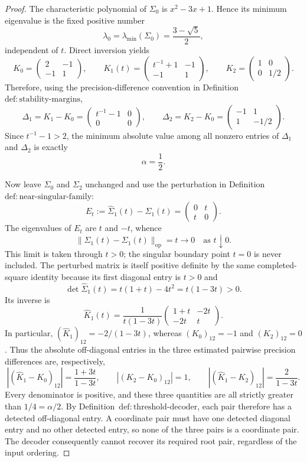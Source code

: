 \documentclass{article}
\begin{document}
\begin{proof}
The characteristic polynomial of \(\Sigma_0\) is \(x^2-3x+1\).  Hence its minimum eigenvalue is the fixed positive number
\[
 \lambda_{0}=\lambda_{\min}(\Sigma_0)=\frac{3-\sqrt5}{2},
\]
independent of \(t\).  Direct inversion yields
\[
 K_0=\begin{pmatrix}2&-1\\-1&1\end{pmatrix},\qquad
 K_1(t)=\begin{pmatrix}t^{-1}+1&-1\\-1&1\end{pmatrix},\qquad
 K_2=\begin{pmatrix}1&0\\0&1/2\end{pmatrix}.
\]
Therefore, using the precision-difference convention in Definition~\(\mathrm{def:stability\text{-}margins}\),
\[
 \Delta_1=K_1-K_0=
 \begin{pmatrix}t^{-1}-1&0\\0&0\end{pmatrix},
 \qquad
 \Delta_2=K_2-K_0=
 \begin{pmatrix}-1&1\\1&-1/2\end{pmatrix}.
\]
Since \(t^{-1}-1>2\), the minimum absolute value among all nonzero entries of \(\Delta_1\) and \(\Delta_2\) is exactly
\[
 \alpha=\frac12.
\]

Now leave \(\Sigma_0\) and \(\Sigma_2\) unchanged and use the perturbation in Definition~\(\mathrm{def:near\text{-}singular\text{-}family}\):
\[
 E_t:=\widehat\Sigma_1(t)-\Sigma_1(t)
 =\begin{pmatrix}0&t\\t&0\end{pmatrix}.
\]
The eigenvalues of \(E_t\) are \(t\) and \(-t\), whence
\[
 \|\widehat\Sigma_1(t)-\Sigma_1(t)\|_{\mathrm{op}}=t\longrightarrow0
 \quad\text{as }t\downarrow0.
\]
This limit is taken through \(t>0\); the singular boundary point \(t=0\) is never included.  The perturbed matrix is itself positive definite by the same completed-square identity because its first diagonal entry is \(t>0\) and
\[
 \det\widehat\Sigma_1(t)=t(1+t)-4t^2=t(1-3t)>0.
\]
Its inverse is
\[
 \widehat K_1(t)
 =\frac1{t(1-3t)}
 \begin{pmatrix}1+t&-2t\\-2t&t\end{pmatrix}.
\]
In particular, \((\widehat K_1)_{12}=-2/(1-3t)\), whereas \((K_0)_{12}=-1\) and \((K_2)_{12}=0\).  Thus the absolute off-diagonal entries in the three estimated pairwise precision differences are, respectively,
\[
 \left| (\widehat K_1-K_0)_{12}\right|
   =\frac{1+3t}{1-3t},\qquad
 \left| (K_2-K_0)_{12}\right|=1,
 \qquad
 \left| (\widehat K_1-K_2)_{12}\right|
   =\frac2{1-3t}.
\]
Every denominator is positive, and these three quantities are all strictly greater than \(1/4=\alpha/2\).  By Definition~\(\mathrm{def:threshold\text{-}decoder}\), each pair therefore has a detected off-diagonal entry.  A coordinate pair must have one detected diagonal entry and no other detected entry, so none of the three pairs is a coordinate pair.  The decoder consequently cannot recover its required root pair, regardless of the input ordering.


\end{proof}
\end{document}
